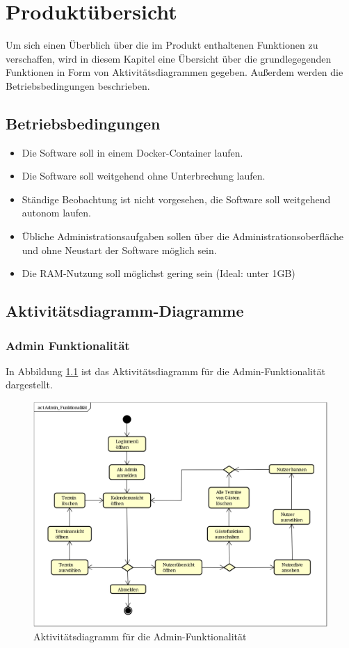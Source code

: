 
\chapter{Produktübersicht}
\label{chap:product_overview}
Um sich einen Überblich über die im Produkt enthaltenen Funktionen zu verschaffen, wird in diesem Kapitel eine Übersicht über die grundlegegenden Funktionen in Form von Aktivitätsdiagrammen gegeben.
Außerdem werden die Betriebsbedingungen beschrieben.
\section{Betriebsbedingungen}
\begin{itemize}
    \item Die Software soll in einem \gls{Docker}-\gls{Container} laufen.
    \item Die Software soll weitgehend ohne Unterbrechung laufen.
    \item Ständige Beobachtung ist nicht vorgesehen, die Software soll weitgehend autonom laufen.
    \item Übliche Administrationsaufgaben sollen über die Administrationsoberfläche und ohne Neustart der Software möglich sein.
    \item Die \gls{RAM}-Nutzung soll möglichst gering sein (Ideal: unter 1GB)
\end{itemize}

\newpage
\section{Aktivitätsdiagramm-Diagramme}

\subsection{Admin Funktionalität}
In Abbildung \ref{fig:activity_diagram_admin} ist das Aktivitätsdiagramm für die Admin-Funktionalität dargestellt.
\begin{figure}[ht]
    \centering
    \includegraphics[scale=0.15]{figures/activitydiagrams/adminfunk}
    \caption{Aktivitätsdiagramm für die Admin-Funktionalität}
    \label{fig:activity_diagram_admin}
\end{figure}
\clearpage
